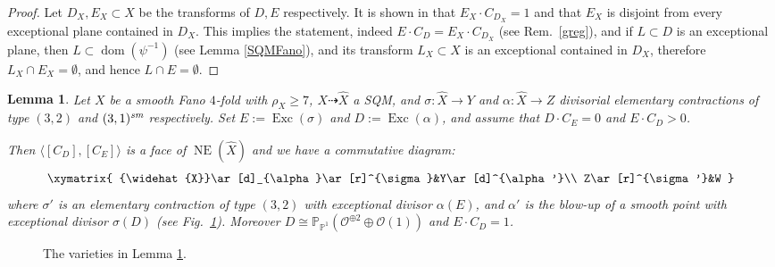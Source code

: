 \documentclass[a4paper,12pt]{amsart}
\newtheorem{lemma}[thm]{Lemma}
\theoremstyle{definition}
\numberwithin{figure}{section}
\numberwithin{table}{section}
\newcommand{\ol}{\mathcal{O}}
\newcommand{\wi}{\widehat}
\newcommand{\pr}{\mathbb{P}}
\newcommand{\dom}{\operatorname{dom}}
\newcommand{\NE}{\operatorname{NE}}
\newcommand{\Exc}{\operatorname{Exc}}
\newcommand{\sm}{\text{\it sm}}
\begin{document}
\begin{proof}
  Let $D_X,E_X\subset X$ be the transforms of $D,E$ respectively.
  It is shown in \cite[Lemma 4.23]{small} that  $E_X\cdot C_{D_X}=1$ and
  that $E_X$ is disjoint from every exceptional plane contained in $D_X$.
  This implies the statement,
  indeed $E\cdot C_D=E_X\cdot C_{D_X}$ (see Rem.~\ref{greg}), and if  $L\subset D$ is an exceptional plane,
  then $L\subset\dom(\psi^{-1})$ (see Lemma \ref{SQMFano}), and its transform $L_X\subset X$ is an exceptional contained in $D_X$, therefore $L_X\cap E_X=\emptyset$, and hence $L\cap E=\emptyset$.
\end{proof}
\begin{lemma}\label{square}
  Let $X$ be a smooth Fano $4$-fold with $\rho_X\geq 7$,
  $X\dasharrow\wi{X}$ a SQM, and
  $\sigma\colon \wi{X}\to Y$ and  $\alpha\colon \wi{X}\to Z$ divisorial elementary contractions of type $(3,2)$ and $(3,1)^{\sm}$ respectively. Set $E:=\Exc(\sigma)$ and $D:=\Exc(\alpha)$, and assume that $D\cdot C_E=0$ and $E\cdot C_D>0$.

 Then 
 $\langle [C_D],[C_E]\rangle$ is a face of $\NE(\wi{X})$ and we have a commutative diagram:
 \begin{equation}\label{sq} \xymatrix{
{\wi{X}}\ar[d]_{\alpha}\ar[r]^{\sigma}&Y\ar[d]^{\alpha'}\\
Z\ar[r]^{\sigma'}&W
}\end{equation}
where $\sigma'$ is an elementary contraction of type $(3,2)$ with exceptional divisor  $\alpha(E)$, and $\alpha'$ is the blow-up of a smooth point with exceptional divisor $\sigma(D)$ (see Fig.~\ref{figura_square}). Moreover $D\cong\pr_{\pr^1}(\ol^{\oplus 2}\oplus\ol(1))$ and $E\cdot C_D=1$.
\end{lemma}
\begin{figure}\caption{The varieties in Lemma \ref{square}.}\label{figura_square}

  \bigskip

  \medskip
  
  
\end{figure}
\end{document}
